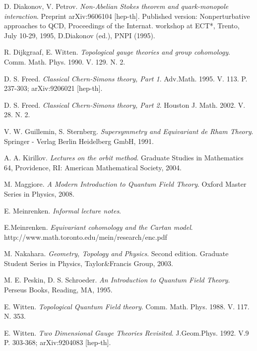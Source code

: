 \documentclass[11pt]{report}
\theoremstyle{plain}
\theoremstyle{definition}
\theoremstyle{remark}
\theoremstyle{remark}
\numberwithin{equation}{section}
\begin{document}
\begin{thebibliography}{9}
 D. Diakonov, V. Petrov. 
\textit{Non-Abelian Stokes theorem and quark-monopole interaction}. 
Preprint arXiv:9606104 [hep-th].
Published version: Nonperturbative approaches to QCD, Proceedings of the Internat. workshop at ECT*, Trento, July 10-29, 1995, D.Diakonov (ed.), PNPI (1995).

 R. Dijkgraaf, E. Witten. 
\textit{Topological gauge theories and group cohomology}. 
Comm. Math. Phys. 1990. V. 129. N. 2.

 D. S. Freed. 
\textit{Classical Chern-Simons theory, Part 1}.  
Adv.Math. 1995. V. 113. P. 237-303; arXiv:9206021 [hep-th].

 D. S. Freed. 
\textit{Classical Chern-Simons theory, Part 2}. 
Houston J. Math. 2002. V. 28. N. 2.


 V. W. Guillemin, S. Sternberg. 
\textit{Supersymmetry and Equivariant de Rham Theory}. 
Springer - Verlag Berlin Heidelberg GmbH, 1991.

 A. A. Kirillov. 
\textit{Lectures on the orbit method}. 
Graduate Studies in Mathematics 64, Providence, RI: American Mathematical Society, 2004.

 M. Maggiore. 
\textit{A Modern Introduction to Quantum Field Theory}. 
Oxford Master Series in Physics, 2008.

 E. Meinrenken. 
\textit{Informal lecture notes}.

 E.Meinrenken. 
\textit{Equivariant cohomology and the Cartan model}.
http://www.math.toronto.edu/mein/research/enc.pdf 
 

 M. Nakahara. 
\textit{Geometry, Topology and Physics}. Second edition. 
Graduate Student Series in Physics, Taylor\&Francis Group, 2003.

 M. E. Peskin, D. S. Schroeder. 
\textit{An Introduction to Quantum Field Theory}. 
Perseus Books, Reading, MA, 1995.

 E. Witten. 
\textit{Topological Quantum Field theory}. 
Comm. Math. Phys. 1988. V. 117. N. 353.

 E. Witten. 
\textit{Two Dimensional Gauge Theories Revisited}. 
J.Geom.Phys. 1992. V.9 P. 303-368; arXiv:9204083 [hep-th].


\end{thebibliography}
\end{document}
